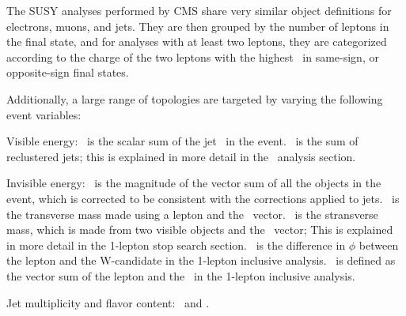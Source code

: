 The SUSY analyses performed by CMS share very similar object definitions for electrons, muons, and jets. 
They are then grouped by the number of leptons in the final state,
and for analyses with at least two leptons,
they are categorized according to the charge of the two leptons with the highest \pt\
in same-sign, or opposite-sign final states.

Additionally, a large range of topologies are targeted by varying the following event variables:

Visible energy:
\HT\ is the scalar sum of the jet \pt\ in the event.
\MJ\ is the sum of reclustered jets; this is explained in more detail in the \MJ\ analysis section.

Invisible energy:
\MET\ is the magnitude of the vector sum of all the objects in the event, which is corrected to be consistent with the corrections applied to jets.
\MT\ is the transverse mass made using a lepton and the \MET\ vector.
\MTtwo\ is the stransverse mass, which is made from two visible objects and the \MET\ vector; This is explained in more detail in the 1-lepton stop search section.
\dphiwl\ is the difference in $\phi$ between the lepton and the W-candidate in the 1-lepton inclusive analysis.
\LT\ is defined as the vector sum of the lepton and the \MET\ in the 1-lepton inclusive analysis.

Jet multiplicity and flavor content: \njets\ and \nbtags.

